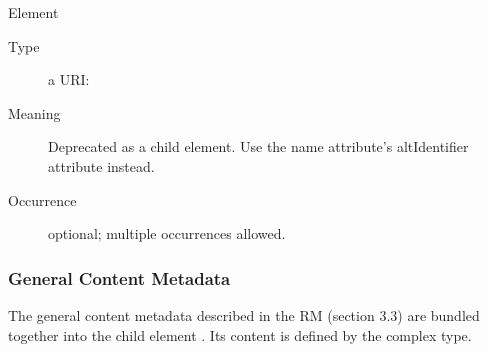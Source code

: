 \documentclass[11pt,a4paper]{ivoa}
\begin{document}
\begin{generated}
\begin{bigdescription}
\begin{description}
\end{description}
\item[Element \xmlel{altIdentifier}]
\begin{description}
\item[Type] a URI: 
\item[Meaning]
              	Deprecated as a child element.  Use the name
              	attribute's altIdentifier attribute instead.

\item[Occurrence] optional; multiple occurrences allowed.

\end{description}


\end{bigdescription}\endgroup

\endgroup
\end{generated}




\subsubsection{General Content Metadata}


The general content metadata described in the RM
(section 3.3) are bundled together into the 
child element .  Its content is
defined by the  complex type.
\end{document}
